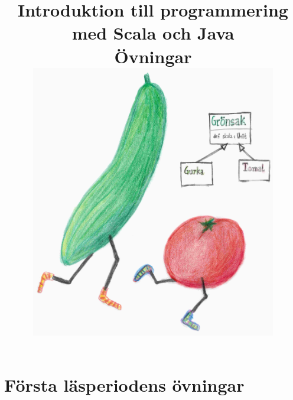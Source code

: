 \documentclass[a4paper]{compendium}
\title{
{\vspace{-3.0cm}\bf\sffamily\Huge\selectfont  Introduktion till programmering med Scala och Java}
\\ \vspace{1em}%
{\sffamily Övningar}\\\vspace{2cm}
\includegraphics[height=12cm]{cover/gurka.jpg}
}
\date{\raggedbottom%
\vspace{-2em}\begin{minipage}{1.0\textwidth}\centering
EDAA45, Lp1-2, HT 2016\\
Datavetenskap, LTH\\
Lunds Universitet\\
~\\
Kompileringsdatum: \today \\
\url{http://cs.lth.se/pgk}
\end{minipage}
}
\newcommand{\SlideHeading}[1]{} %
\newif\ifPreSolution  %
\begin{document}

\frontmatter
\maketitle

%
%

\setcounter{tocdepth}{1} %
\tableofcontents
\mainmatter



\part{Första läsperiodens övningar}


\PreSolutiontrue  
\PreSolutionfalse 


\PreSolutiontrue  
\PreSolutionfalse 


\PreSolutiontrue  
\PreSolutionfalse 


\PreSolutiontrue  
\PreSolutionfalse 


\PreSolutiontrue  
\PreSolutionfalse 


\PreSolutiontrue  
\PreSolutionfalse 


\PreSolutiontrue  
\PreSolutionfalse 
\end{document}

